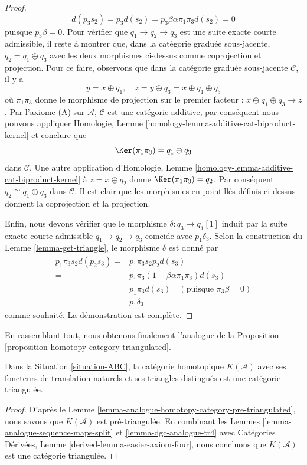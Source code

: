 \begin{proof}
$$
d(p_3s_2) = p_3d(s_2) = p_3\beta\alpha\pi_1\pi_3 d(s_2) = 0
$$
puisque $p_3\beta = 0$. Pour vérifier que $q_1\to q_2\to q_3$ est une suite exacte
courte admissible, il reste à montrer que, dans la catégorie graduée sous-jacente,
$q_2 = q_1\oplus q_3$ avec les deux morphismes ci-dessus comme coprojection et
projection. Pour ce faire, observons que dans la catégorie graduée sous-jacente
$\mathcal{C}$, il y a
$$
y = x\oplus q_1,\quad
z = y\oplus q_3 = x\oplus q_1\oplus q_3
$$
où $\pi_1\pi_3$ donne le morphisme de projection sur le premier facteur : $x\oplus
q_1\oplus q_3\to z$. Par l'axiome (A) sur $\mathcal{A}$, $\mathcal{C}$ est une
catégorie additive, par conséquent nous pouvons appliquer Homologie, Lemme
\ref{homology-lemma-additive-cat-biproduct-kernel} et conclure que
$$
\Ker(\pi_1\pi_3) = q_1\oplus q_3
$$
dans $\mathcal{C}$. Une autre application d'Homologie, Lemme
\ref{homology-lemma-additive-cat-biproduct-kernel} à $z = x\oplus q_2$ donne
$\Ker(\pi_1\pi_3) = q_2$. Par conséquent $q_2\cong q_1\oplus q_3$ dans
$\mathcal{C}$. Il est clair que les morphismes en pointillés définis ci-dessus
donnent la coprojection et la projection.

\medskip\noindent
Enfin, nous devons vérifier que le morphisme $\delta : q_3 \to q_1[1]$ induit par
la suite exacte courte admissible $q_1\to q_2\to q_3$ coïncide avec $p_1\delta_3$.
Selon la construction du Lemme \ref{lemma-get-triangle}, le morphisme $\delta$ est
donné par
\begin{align*}
p_1\pi_3s_2d(p_2s_3)
= &
p_1\pi_3s_2p_2d(s_3) \\
= &
p_1\pi_3(1-\beta\alpha\pi_1\pi_3)d(s_3) \\
= &
p_1\pi_3d(s_3)\quad (\text{puisque }\pi_3\beta = 0) \\
= &
p_1\delta_3
\end{align*}
comme souhaité. La démonstration est complète.
\end{proof}

\noindent
En rassemblant tout, nous obtenons finalement l'analogue de la Proposition
\ref{proposition-homotopy-category-triangulated}.

\begin{proposition}
\label{proposition-ABC-homotopy-category-triangulated}
Dans la Situation \ref{situation-ABC}, la catégorie homotopique $K(\mathcal{A})$
avec ses foncteurs de translation naturels et ses triangles distingués est une
catégorie triangulée.
\end{proposition}

\begin{proof}
D'après le Lemme \ref{lemma-analogue-homotopy-category-pre-triangulated}, nous
savons que $K(\mathcal{A})$ est pré-triangulée. En combinant les Lemmes
\ref{lemma-analogue-sequence-maps-split} et \ref{lemma-dgc-analogue-tr4} avec
Catégories Dérivées, Lemme \ref{derived-lemma-easier-axiom-four}, nous concluons
que $K(\mathcal{A})$ est une catégorie triangulée.
\end{proof}

